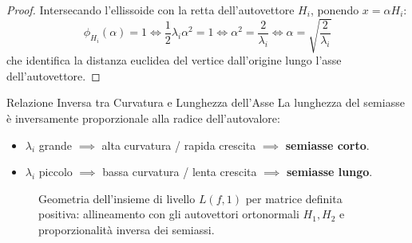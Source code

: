 \begin{proof}
Intersecando l'ellissoide con la retta dell'autovettore $H_i$, ponendo $x = \alpha H_i$:
\begin{equation}
\phi_{H_i}(\alpha) = 1 \iff \frac{1}{2} \lambda_i \alpha^2 = 1 \iff \alpha^2 = \frac{2}{\lambda_i} \iff \alpha = \sqrt{\frac{2}{\lambda_i}}
\end{equation}
che identifica la distanza euclidea del vertice dall'origine lungo l'asse dell'autovettore.
\end{proof}

\begin{noteblock}{Relazione Inversa tra Curvatura e Lunghezza dell'Asse}
La lunghezza del semiasse \`e inversamente proporzionale alla radice dell'autovalore:
\begin{itemize}
    \item $\lambda_i$ grande $\implies$ alta curvatura / rapida crescita $\implies$ \textbf{semiasse corto}.
    \item $\lambda_i$ piccolo $\implies$ bassa curvatura / lenta crescita $\implies$ \textbf{semiasse lungo}.
\end{itemize}
\end{noteblock}

\begin{figure}[H]
\centering
{}
\caption{Geometria dell'insieme di livello $L(f, 1)$ per matrice definita positiva: allineamento con gli autovettori ortonormali $H_1, H_2$ e proporzionalit\`a inversa dei semiassi.}
\label{fig:ellisse-autovettori}
\end{figure}

